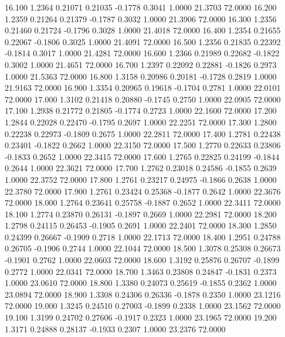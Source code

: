   16.100   1.2364   0.21071   0.21035  -0.1778   0.3041   1.0000  21.3703  72.0000
  16.200   1.2359   0.21264   0.21379  -0.1787   0.3032   1.0000  21.3906  72.0000
  16.300   1.2356   0.21460   0.21724  -0.1796   0.3028   1.0000  21.4018  72.0000
  16.400   1.2354   0.21655   0.22067  -0.1806   0.3025   1.0000  21.4091  72.0000
  16.500   1.2356   0.21835   0.22392  -0.1814   0.3017   1.0000  21.4281  72.0000
  16.600   1.2366   0.21989   0.22682  -0.1822   0.3002   1.0000  21.4651  72.0000
  16.700   1.2397   0.22092   0.22881  -0.1826   0.2973   1.0000  21.5363  72.0000
  16.800   1.3158   0.20986   0.20181  -0.1728   0.2819   1.0000  21.9163  72.0000
  16.900   1.3354   0.20965   0.19618  -0.1704   0.2781   1.0000  22.0101  72.0000
  17.000   1.3102   0.21418   0.20880  -0.1745   0.2750   1.0000  22.0905  72.0000
  17.100   1.2938   0.21772   0.21805  -0.1774   0.2723   1.0000  22.1600  72.0000
  17.200   1.2844   0.22028   0.22470  -0.1795   0.2697   1.0000  22.2251  72.0000
  17.300   1.2800   0.22238   0.22973  -0.1809   0.2675   1.0000  22.2811  72.0000
  17.400   1.2781   0.22438   0.23401  -0.1822   0.2662   1.0000  22.3150  72.0000
  17.500   1.2770   0.22633   0.23806  -0.1833   0.2652   1.0000  22.3415  72.0000
  17.600   1.2765   0.22825   0.24199  -0.1844   0.2644   1.0000  22.3621  72.0000
  17.700   1.2762   0.23018   0.24586  -0.1855   0.2639   1.0000  22.3752  72.0000
  17.800   1.2761   0.23217   0.24975  -0.1866   0.2638   1.0000  22.3780  72.0000
  17.900   1.2761   0.23424   0.25368  -0.1877   0.2642   1.0000  22.3676  72.0000
  18.000   1.2764   0.23641   0.25758  -0.1887   0.2652   1.0000  22.3411  72.0000
  18.100   1.2774   0.23870   0.26131  -0.1897   0.2669   1.0000  22.2981  72.0000
  18.200   1.2798   0.24115   0.26453  -0.1905   0.2691   1.0000  22.2401  72.0000
  18.300   1.2850   0.24399   0.26667  -0.1909   0.2718   1.0000  22.1713  72.0000
  18.400   1.2951   0.24788   0.26705  -0.1906   0.2744   1.0000  22.1044  72.0000
  18.500   1.3078   0.25308   0.26673  -0.1901   0.2762   1.0000  22.0603  72.0000
  18.600   1.3192   0.25876   0.26707  -0.1899   0.2772   1.0000  22.0341  72.0000
  18.700   1.3463   0.23808   0.24847  -0.1831   0.2373   1.0000  23.0610  72.0000
  18.800   1.3380   0.24073   0.25619  -0.1855   0.2362   1.0000  23.0894  72.0000
  18.900   1.3308   0.24306   0.26336  -0.1878   0.2350   1.0000  23.1216  72.0000
  19.000   1.3245   0.24510   0.27003  -0.1899   0.2338   1.0000  23.1562  72.0000
  19.100   1.3199   0.24702   0.27606  -0.1917   0.2323   1.0000  23.1965  72.0000
  19.200   1.3171   0.24888   0.28137  -0.1933   0.2307   1.0000  23.2376  72.0000
